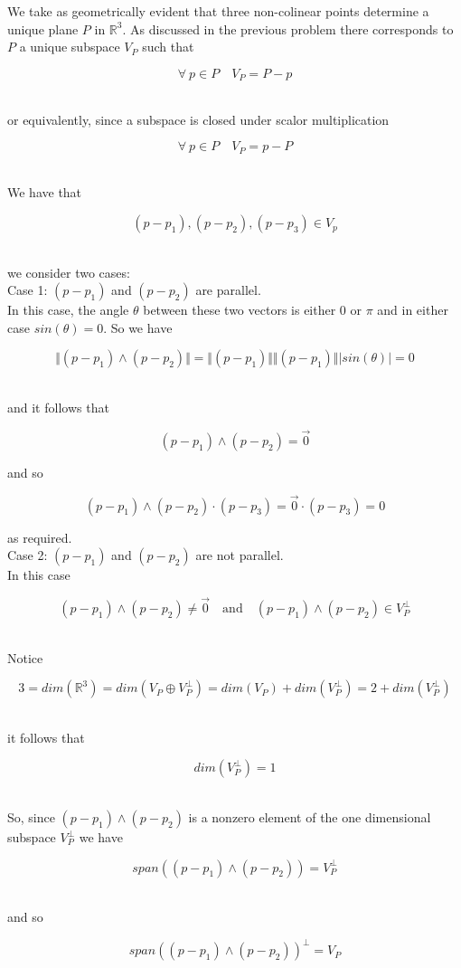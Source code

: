 \documentclass[12pt,letterpaper]{hmcpset}
\begin{document}
\begin{solution}
We take as geometrically evident that three non-colinear points determine a unique plane $P$ in $\mathbb{R}^3$.  As discussed in the previous problem there corresponds to $P$ a unique subspace $V_P$ such that

\[ \forall \  p \in P \quad V_P = P - p \]\

or equivalently, since a subspace is closed under scalor multiplication

\[ \forall \  p \in P \quad V_P = p-P \]\

We have that

\[ (p-p_1), (p-p_2), (p-p_3) \in V_p\]\

we consider two cases:\\

Case 1:  $(p-p_1)$ and $(p-p_2)$ are parallel. \\

In this case, the angle $\theta$ between these two vectors is either $0$ or $\pi$ and in either case $sin(\theta)=0$.  So we have

 \[\Vert (p-p_1)\wedge(p-p_2)\Vert = \Vert (p-p_1)\Vert\Vert (p-p_1)\Vert\vert sin(\theta)\vert =0\]\

and it follows that

\[ (p-p_1)\wedge(p-p_2) = \vec0\]

and so

\[ (p-p_1)\wedge(p-p_2)\cdot(p-p_3) = \vec0 \cdot (p- p_3)= 0 \]

as required.\\


Case 2: $(p-p_1)$ and $(p-p_2)$ are not parallel. \\

In this case 

\[ (p-p_1)\wedge(p-p_2) \neq \vec0 \quad \text{and} \quad (p-p_1)\wedge(p-p_2) \in V_P^{\bot}\]\

Notice

\[ 3 = dim(\mathbb{R}^3) = dim(V_P \oplus V_P^{\bot}) = dim(V_P) + dim(V_P^{\bot}) = 2 + dim(V_P^{\bot})\]\

it follows that

\[ dim(V_P^{\bot}) = 1\]\

So, since $(p-p_1)\wedge(p-p_2) $ is a nonzero element of the one dimensional subspace $V_P^{\bot}$ we have

\[ span((p-p_1)\wedge(p-p_2) ) =  V_P^{\bot}\]\

and so

\[ span((p-p_1)\wedge(p-p_2) )^{\bot} =  V_P\]\


\end{solution}
\end{document}
